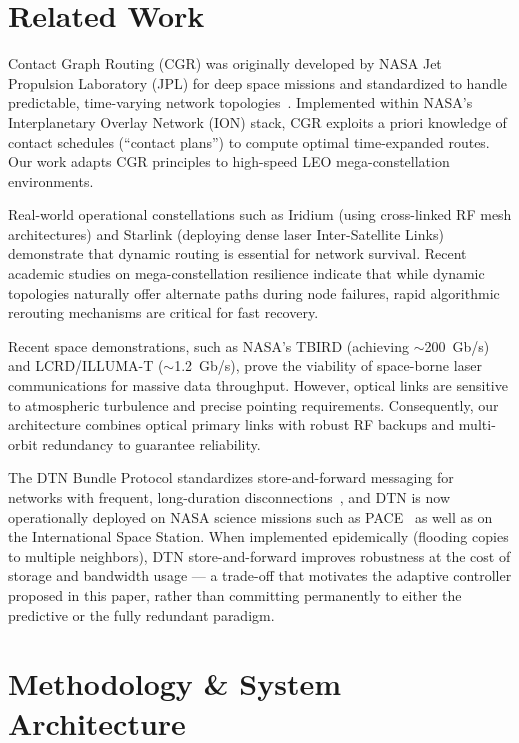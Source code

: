 \documentclass[10pt,twocolumn]{article}
\begin{document}
\section{Related Work}

Contact Graph Routing (CGR) was originally developed by NASA Jet Propulsion Laboratory (JPL) for deep space missions and standardized to handle predictable, time-varying network topologies~\cite{cgr,cgr_jpl}. Implemented within NASA's Interplanetary Overlay Network (ION) stack, CGR exploits a priori knowledge of contact schedules (``contact plans'') to compute optimal time-expanded routes. Our work adapts CGR principles to high-speed LEO mega-constellation environments.

Real-world operational constellations such as Iridium (using cross-linked RF mesh architectures) and Starlink (deploying dense laser Inter-Satellite Links) demonstrate that dynamic routing is essential for network survival. Recent academic studies on mega-constellation resilience indicate that while dynamic topologies naturally offer alternate paths during node failures, rapid algorithmic rerouting mechanisms are critical for fast recovery.

Recent space demonstrations, such as NASA's TBIRD (achieving $\sim$200~Gb/s)~\cite{tbird} and LCRD/ILLUMA-T ($\sim$1.2~Gb/s), prove the viability of space-borne laser communications for massive data throughput. However, optical links are sensitive to atmospheric turbulence and precise pointing requirements. Consequently, our architecture combines optical primary links with robust RF backups and multi-orbit redundancy to guarantee reliability.

The DTN Bundle Protocol standardizes store-and-forward messaging for networks with frequent, long-duration disconnections~\cite{bundle}, and DTN is now operationally deployed on NASA science missions such as PACE~\cite{pace_dtn} as well as on the International Space Station. When implemented epidemically (flooding copies to multiple neighbors), DTN store-and-forward improves robustness at the cost of storage and bandwidth usage --- a trade-off that motivates the adaptive controller proposed in this paper, rather than committing permanently to either the predictive or the fully redundant paradigm.

\section{Methodology \& System Architecture}
\end{document}
